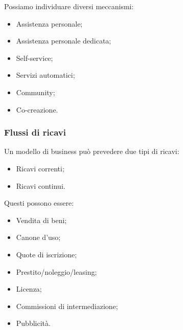 \documentclass[a4paper,11pt]{article}
\begin{document}
Possiamo individuare diversi meccanismi:
\begin{itemize}
	\item Assistenza personale;
	\item Assistenza personale dedicata;
	\item Self-service;
	\item Servizi automatici;
	\item Community;
	\item Co-creazione.
\end{itemize}

\subsubsection{Flussi di ricavi}
Un modello di business può prevedere due tipi di ricavi:
\begin{itemize}
	\item Ricavi correnti;
	\item Ricavi continui.
\end{itemize}

Questi possono essere:
\begin{itemize}
	\item Vendita di beni;
	\item Canone d'uso;
	\item Quote di iscrizione;
	\item Prestito/noleggio/leasing;
	\item Licenza;
	\item Commissioni di intermediazione;
	\item Pubblicità.
\end{itemize}
\end{document}
